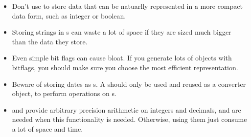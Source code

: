 \begin{itemize}
  \item  Don't use  to store data that can be natuarlly
  represented in a more compact data form, such as integer or boolean.
  \item Storing strings in s can waste a lot of space
  if they are sized much bigger than the data they store.
  \item Even simple bit flags can cause bloat. If you generate lots of objects
  with bitflags, you should make sure you choose the most efficient
  representation.
  \item Beware of storing dates as s.  A
   should only be used and reused as a converter
  object, to perform operations on s.
  \item {} and  provide arbitrary precision
  arithmetic on integers and decimals, and are needed when this functionality is
  needed. Otherwise, using them just consume a lot of space and time.
\end{itemize}










